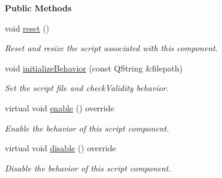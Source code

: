 \begin{Indent}\textbf{ Public Methods}\par
\begin{DoxyCompactItemize}
\item 
\mbox{\label{classrev_1_1_script_component_adeaf7db8351b9d910d9b9571f99a0b01}} 
void \mbox{\hyperlink{classrev_1_1_script_component_adeaf7db8351b9d910d9b9571f99a0b01}{reset}} ()
\begin{DoxyCompactList}\small\item\em Reset and resize the script associated with this component. \end{DoxyCompactList}\item 
\mbox{\label{classrev_1_1_script_component_ad4191c86c71ab6ac6b28413cab458262}} 
void \mbox{\hyperlink{classrev_1_1_script_component_ad4191c86c71ab6ac6b28413cab458262}{initialize\+Behavior}} (const Q\+String \&filepath)
\begin{DoxyCompactList}\small\item\em Set the script file and check\+Validity behavior. \end{DoxyCompactList}\item 
\mbox{\label{classrev_1_1_script_component_abc78b813835cd55f5c1d9f68cba0f6c7}} 
virtual void \mbox{\hyperlink{classrev_1_1_script_component_abc78b813835cd55f5c1d9f68cba0f6c7}{enable}} () override
\begin{DoxyCompactList}\small\item\em Enable the behavior of this script component. \end{DoxyCompactList}\item 
\mbox{\label{classrev_1_1_script_component_a14650265f0ca62894e0df37f7917d368}} 
virtual void \mbox{\hyperlink{classrev_1_1_script_component_a14650265f0ca62894e0df37f7917d368}{disable}} () override
\begin{DoxyCompactList}\small\item\em Disable the behavior of this script component. \end{DoxyCompactList}\end{DoxyCompactItemize}
\end{Indent}
